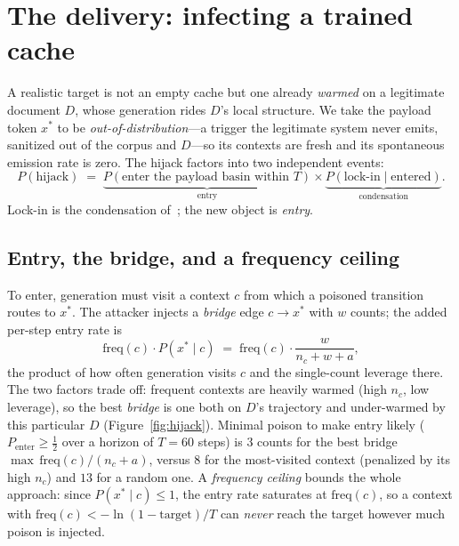 \documentclass[11pt]{article}
\theoremstyle{plain}
\theoremstyle{definition}
\theoremstyle{remark}
\newcommand{\xstar}{x^{\!*}}
\begin{document}
\section{The delivery: infecting a trained cache}\label{sec:delivery}
A realistic target is not an empty cache but one already \emph{warmed} on a legitimate document
$D$, whose generation rides $D$'s local structure. We take the payload token $\xstar$ to be
\emph{out-of-distribution}---a trigger the legitimate system never emits, sanitized out of the
corpus and $D$---so its contexts are fresh and its spontaneous emission rate is zero. The hijack
factors into two independent events:
\[
P(\text{hijack})\;=\;\underbrace{P(\text{enter the payload basin within }T)}_{\text{entry}}
\times
\underbrace{P(\text{lock-in}\mid\text{entered})}_{\text{condensation}} .
\]
Lock-in is the condensation of~\cite{shumow2026trust}; the new object is \emph{entry}.

\subsection{Entry, the bridge, and a frequency ceiling}\label{sec:entry}
To enter, generation must visit a context $c$ from which a poisoned transition routes to
$\xstar$. The attacker injects a \emph{bridge} edge $c\to\xstar$ with $w$ counts; the added
per-step entry rate is
\begin{equation}\label{eq:entryrate}
\text{freq}(c)\cdot P(\xstar\mid c)\;=\;\text{freq}(c)\cdot\frac{w}{n_c+w+a},
\end{equation}
the product of how often generation visits $c$ and the single-count leverage there. The two
factors trade off: frequent contexts are heavily warmed (high $n_c$, low leverage), so the best
\emph{bridge} is one both on $D$'s trajectory and under-warmed by this particular $D$
(Figure~\ref{fig:hijack}). Minimal poison to make entry likely ($P_{\text{enter}}\ge\frac12$
over a horizon of $T=60$ steps) is $3$ counts for the best bridge $\max\,\text{freq}(c)/(n_c+a)$, versus $8$ for the
most-visited context (penalized by its high $n_c$) and $13$ for a random one. A
\emph{frequency ceiling} bounds the whole approach: since $P(\xstar\mid c)\le1$, the entry rate
saturates at $\text{freq}(c)$, so a context with $\text{freq}(c)<-\ln(1-\text{target})/T$ can
\emph{never} reach the target however much poison is injected.
\end{document}

